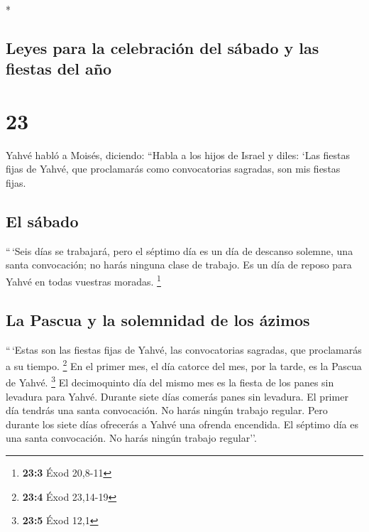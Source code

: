 \begin{paracol}{2}
\begin{otherlanguage}{english}
\end{otherlanguage}

\switchcolumn[0]*

\hypertarget{leyes-para-la-celebraciuxf3n-del-suxe1bado-y-las-fiestas-del-auxf1o}{%
\subsection{Leyes para la celebración del sábado y las fiestas del
año}\label{leyes-para-la-celebraciuxf3n-del-suxe1bado-y-las-fiestas-del-auxf1o}}

\hypertarget{section-44}{%
\section{23}\label{section-44}}

 Yahvé habló a Moisés, diciendo:  ``Habla a
los hijos de Israel y diles: `Las fiestas fijas de Yahvé, que
proclamarás como convocatorias sagradas, son mis fiestas fijas.

\hypertarget{el-suxe1bado}{%
\subsection{El sábado}\label{el-suxe1bado}}

 ``\,`Seis días se trabajará, pero el séptimo día es un
día de descanso solemne, una santa convocación; no harás ninguna clase
de trabajo. Es un día de reposo para Yahvé en todas vuestras moradas.
\footnote{\textbf{23:3} Éxod 20,8-11}

\hypertarget{la-pascua-y-la-solemnidad-de-los-uxe1zimos}{%
\subsection{La Pascua y la solemnidad de los
ázimos}\label{la-pascua-y-la-solemnidad-de-los-uxe1zimos}}

 ``\,`Estas son las fiestas fijas de Yahvé, las
convocatorias sagradas, que proclamarás a su tiempo. \footnote{\textbf{23:4}
  Éxod 23,14-19}  En el primer mes, el día catorce del
mes, por la tarde, es la Pascua de Yahvé. \footnote{\textbf{23:5} Éxod
  12,1}  El decimoquinto día del mismo mes es la fiesta de
los panes sin levadura para Yahvé. Durante siete días comerás panes sin
levadura.  El primer día tendrás una santa convocación. No
harás ningún trabajo regular.  Pero durante los siete días
ofrecerás a Yahvé una ofrenda encendida. El séptimo día es una santa
convocación. No harás ningún trabajo regular''.


\end{paracol}

